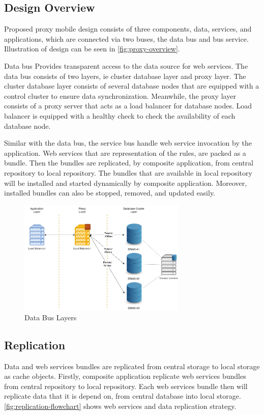 \documentclass[conference]{IEEEtran}
\begin{document}
\subsection{Design Overview}
Proposed proxy mobile design consists of three components, data, services, and applications, which are connected via two buses, the data bus and bus service. Illustration of design can be seen in \figurename{\ref{fig:proxy-overview}}.

Data bus Provides transparent access to the data source for web services. The data bus consists of two layers, ie cluster database layer and proxy layer. The cluster database layer consists of several database nodes that are equipped with a control cluster to ensure data synchronization. Meanwhile, the proxy layer consists of a proxy server that acts as a load balancer for database nodes. Load balancer is equipped with a healthy check to check the availability of each database node.

Similar with the data bus, the service bus handle web service invocation by the application. Web services that are representation of the rules, are packed as a bundle. Then the bundles are replicated, by composite application, from central repository to local repository. The bundles that are available in local repository will be installed and started dynamically by composite application. Moreover, installed bundles can also be stopped, removed, and updated easily.

\begin{figure}
    \centering
    \includegraphics[width=8cm]{../Images/proxy-design-data-layers}
    \caption{Data Bus Layers}
    \label{fig:proxy-design-data-layers}
\end{figure}




\subsection{Replication}
Data and web services bundles are replicated from central storage to local storage as cache objects. Firstly, composite application replicate web services bundles from central repository to local repository. Each web services bundle then will replicate data that it is depend on, from central database into local storage. \figurename{\ref{fig:replication-flowchart}} shows web services and data replication strategy.
\end{document}

